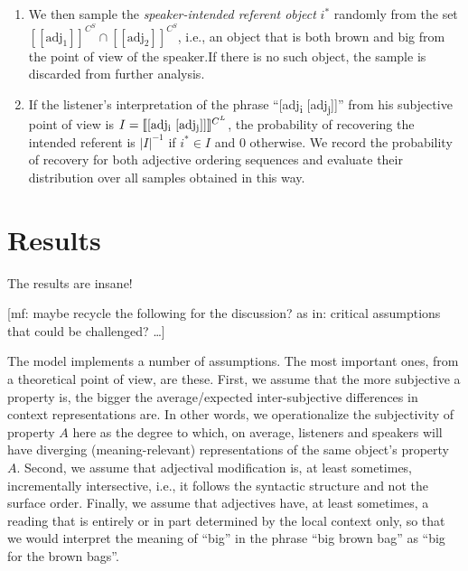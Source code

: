 \documentclass[10pt,a4paper]{article}
\newcommand{\den}[1]{\ensuremath{[\![#1]\!]}}
\newcommand{\mf}[1]{\textcolor{BrickRed}{[mf: #1]}}
\begin{document}
\begin{enumerate}
\item We then sample the \emph{speaker-intended referent object} $i^*$ randomly from the set $\den{\text{adj}_1}^{C^S} \cap \den{\text{adj}_2}^{C^S}$, i.e., an object that is both brown and big from the point of view of the speaker.If there is no such object, the sample is discarded from further analysis.
\item If the listener's interpretation of the phrase ``[adj\textsubscript{i} [adj\textsubscript{j}]]'' from his subjective point of view is $I = \den{\text{[adj\textsubscript{i} [adj\textsubscript{j}]]}}^{C^L}$, the probability of recovering the intended referent is $|I|^{-1}$ if $i^* \in I$ and 0 otherwise. We record the probability of recovery for both adjective ordering sequences and evaluate their distribution over all samples obtained in this way.
\end{enumerate}

\section{Results}

The results are insane!

\bigskip
\bigskip
\bigskip

\mf{maybe recycle the following for the discussion? as in: critical assumptions that could be challenged? \dots}

The model implements a number of assumptions. The most important ones, from a theoretical point of view, are these. First, we assume that the more subjective a property is, the bigger the average/expected inter-subjective differences in context representations are. In other words, we operationalize the subjectivity of property $A$ here as the degree to which, on average, listeners and speakers will have diverging (meaning-relevant) representations of the same object's property $A$. Second, we assume that adjectival modification is, at least sometimes, incrementally intersective, i.e., it follows the syntactic structure and not the surface order. Finally, we assume that adjectives have, at least sometimes, a reading that is entirely or in part determined by the local context only, so that we would interpret the meaning of ``big''  in the phrase ``big brown bag'' as ``big for the brown bags''.

\bigskip






\setlength{\bibleftmargin}{.125in}
\setlength{\bibindent}{-\bibleftmargin}


\end{document}
